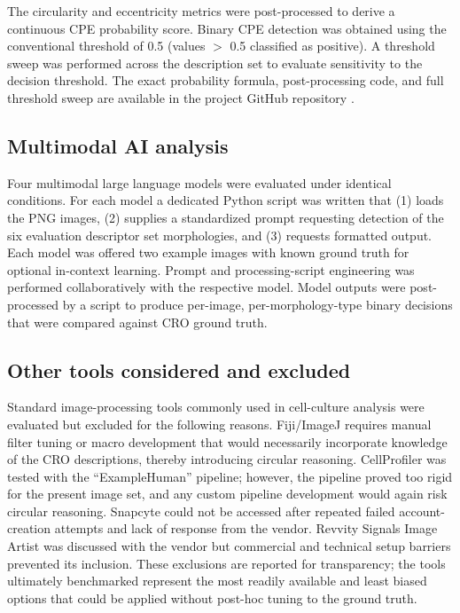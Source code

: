 \documentclass[12pt,a4paper]{article}
\begin{document}


The circularity and eccentricity metrics were post-processed to derive a continuous CPE probability score. Binary CPE detection was obtained using the conventional threshold of 0.5 (values $>$ 0.5 classified as positive). A threshold sweep was performed across the description set to evaluate sensitivity to the decision threshold. The exact probability formula, post-processing code, and full threshold sweep are available in the project GitHub repository \cite{github-verocell}.

\subsection{Multimodal AI analysis}
Four multimodal large language models \cite{llms} were evaluated under identical conditions. For each model a dedicated Python script was written that (1) loads the PNG images, (2) supplies a standardized prompt requesting detection of the six evaluation descriptor set morphologies, and (3) requests formatted output. Each model was offered two example images with known ground truth for optional in-context learning. Prompt and processing-script engineering was performed collaboratively with the respective model. Model outputs were post-processed by a script to produce per-image, per-morphology-type binary decisions that were compared against CRO ground truth.

\subsection{Other tools considered and excluded}
Standard image-processing tools commonly used in cell-culture analysis were evaluated but excluded for the following reasons. Fiji/ImageJ \cite{fiji} requires manual filter tuning or macro development that would necessarily incorporate knowledge of the CRO descriptions, thereby introducing circular reasoning. CellProfiler \cite{cellprofiler} was tested with the ``ExampleHuman'' pipeline; however, the pipeline proved too rigid for the present image set, and any custom pipeline development would again risk circular reasoning. Snapcyte \cite{snapcyte} could not be accessed after repeated failed account-creation attempts and lack of response from the vendor. Revvity Signals Image Artist \cite{revvityIA} was discussed with the vendor but commercial and technical setup barriers prevented its inclusion. These exclusions are reported for transparency; the tools ultimately benchmarked represent the most readily available and least biased options that could be applied without post-hoc tuning to the ground truth.
\end{document}
